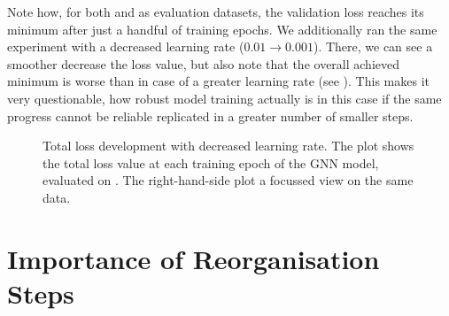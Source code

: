 \documentclass[
	fontsize=10pt, %
	twoside=false, %
	secnumdepth=1, %
  toc=indentunnumbered %
]{kaobook}
\begin{document}
Note how, for both \PDMap and \ReconMap as evaluation datasets, the validation
loss reaches its minimum after just a handful of training epochs. We
additionally ran the same experiment with a decreased learning rate ($0.01
\rightarrow 0.001$). There, we can see a smoother decrease the loss value, but
also note that the overall achieved minimum is worse than in case of a greater
learning rate (see ). This makes it
very questionable, how robust model training actually is in this case if the
same progress cannot be reliable replicated in a greater number of smaller steps.
\begin{figure}[h]
  \centering
  \begin{subfigure}[h]{0.49\linewidth}
  \end{subfigure}
  \begin{subfigure}[h]{0.49\linewidth}
  \end{subfigure}
  \caption{Total loss development with decreased learning rate. The plot shows
    the total loss value at each training epoch of the GNN model, evaluated on
    \ReconMap. The right-hand-side plot a focussed view on the same data.}
  \label{fig:svm-repro-lowlr-reconmapolder-loss}
\end{figure}




\section{Importance of Reorganisation Steps}
\end{document}
